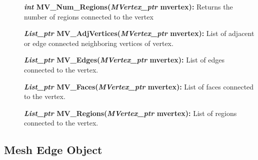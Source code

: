 \documentclass[12pt]{article}
\begin{document}
\begin{description}
\item[]\textbf{\textit{int} MV\_Num\_Regions(\textit{MVertex\_ptr} mvertex):}
Returns the number of regions connected to the vertex

\item[]\textbf{\textit{List\_ptr} MV\_AdjVertices(\textit{MVertex\_ptr}
mvertex):} List of adjacent or edge connected neighboring vertices of vertex.

\item[]\textbf{\textit{List\_ptr} MV\_Edges(\textit{MVertex\_ptr} mvertex):}
List of edges connected to the vertex.

\item[]\textbf{\textit{List\_ptr} MV\_Faces(\textit{MVertex\_ptr} mvertex):}
List of faces connected to the vertex.

\item[]\textbf{\textit{List\_ptr} MV\_Regions(\textit{MVertex\_ptr} mvertex):}
List of regions connected to the vertex.
\end{description}



\newpage
\subsection{Mesh Edge Object}
\end{document}
